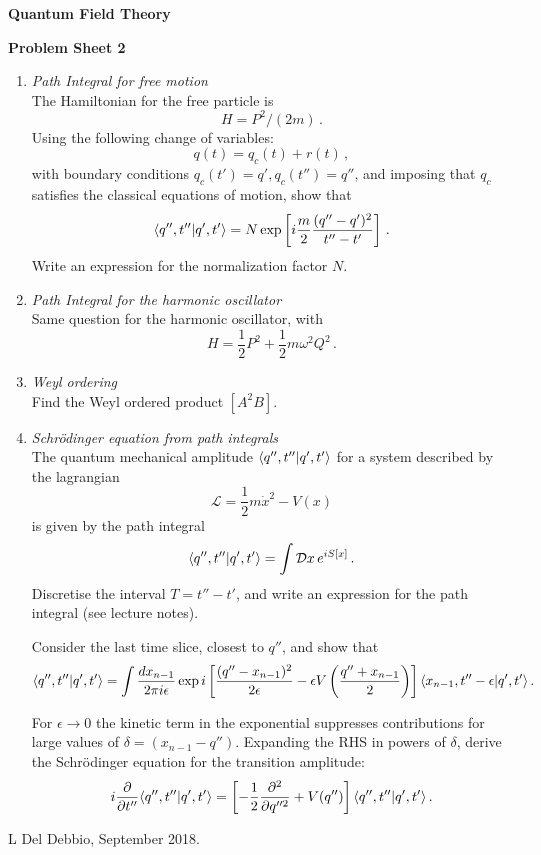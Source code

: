 \documentclass[12pt,a4paper]{article}
\begin{document}
\begin{center}
\textbf{ Quantum Field Theory}\\[\baselineskip]
\end{center}
\textbf{ Problem Sheet 2}

\begin{enumerate}
  \item \emph{ Path Integral for free motion}\\

    The Hamiltonian for the free particle is 
    \[
      H = P^2/(2m)\, .
    \]
    Using the following change of variables:
    \[
      q(t) = q_c(t) + r(t)\, ,
    \]
    with boundary conditions $q_c(t')=q', q_c(t'')=q''$, and imposing
    that $q_c$ satisfies the classical equations of motion, show that
    \[
      \langle q'',t'' | q',t' \rangle=N \exp\left[i \frac{m}{2}
        \frac{(q''-q')^2}{t''-t'}\right]\, .
    \]
    Write an expression for the normalization factor $N$. 

    \bigskip

  \item \emph{ Path Integral for the harmonic oscillator} \\

    Same question for the harmonic oscillator, with 
    \[
      H = \frac12 P^2 + \frac12 m \omega^2 Q^2\, .
    \]

    \bigskip

  \item \emph{ Weyl ordering}\\

    Find the Weyl ordered product $[A^2 B]$.

    \bigskip

  \item \emph{ Schr\"odinger equation from path integrals}\\
    
    The quantum mechanical amplitude $\langle q'',t'' | q',t' \rangle$ for a
    system described by the lagrangian
    \[
      \mathcal{L} = \frac12 m \dot{x}^2 - V(x)
    \]
    is given by the path integral
    \[
      \langle q'',t'' | q',t' \rangle = \int \mathcal{D}x\, e^{i S[x]}\, .
    \]
    Discretise the interval $T=t''-t'$, and write an expression for
    the path integral (see lecture notes). 
    
    Consider the last time slice, closest to $q''$, and show that
    \[
      \langle q'',t'' | q',t' \rangle = \int \frac{dx_{n-1}}{2\pi i \epsilon} 
      \exp i \left[ 
        \frac{(q''-x_{n-1})^2}{2\epsilon} - \epsilon V\left(\frac{q''+x_{n-1}}{2}\right)
      \right]
       \langle x_{n-1},t''-\epsilon | q',t' \rangle\, .
    \]
    
    For $\epsilon\to 0$ the kinetic term in the exponential suppresses
    contributions for large values of $\delta=(x_{n-1}-q'')$. Expanding the
    RHS in powers of $\delta$, derive the Schr\"odinger equation for
    the transition amplitude: 
    \[
      i \frac{\partial}{\partial t''} \langle q'',t'' | q',t' \rangle = 
      \left[-\frac12 \frac{\partial^2}{\partial q''^2} + V(q'') \right]
      \langle q'',t'' | q',t' \rangle\, .
    \]
    
    
\end{enumerate}

\vfill
\hspace*{\fill}\tiny L Del Debbio, September 2018.
\end{document}
